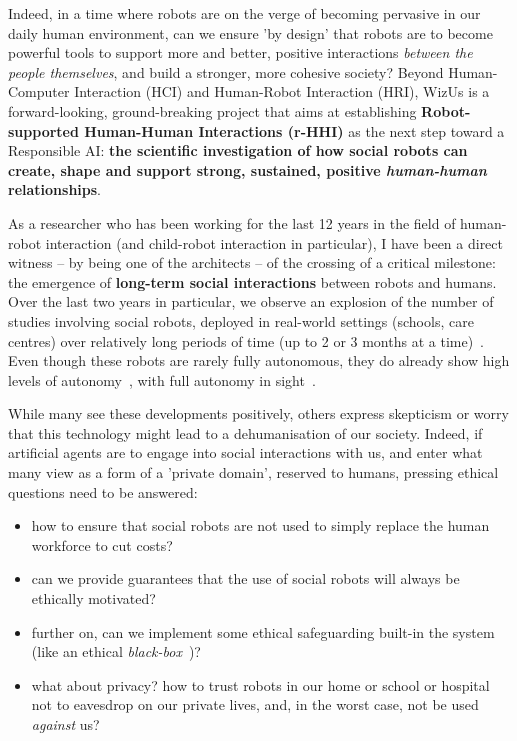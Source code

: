 \documentclass[11pt,a4paper]{report}
\newcommand{\project}{WizUs\xspace}
\begin{document}
Indeed, in a time where robots are on the verge of becoming pervasive in our
daily human environment, can we ensure 'by design' that robots are to become
powerful tools to support more and better, positive interactions \emph{between
the people themselves}, and build a stronger, more cohesive society? Beyond
Human-Computer Interaction (HCI) and Human-Robot Interaction (HRI), \project is
a forward-looking, ground-breaking project that aims at establishing
\textbf{Robot-supported Human-Human Interactions (r-HHI)} as the next step
toward a Responsible AI: \textbf{the scientific investigation of how social
robots can create, shape and support strong, sustained, positive
\emph{human-human} relationships}.

As a researcher who has been working for the last 12 years in the field of
human-robot interaction (and child-robot interaction in particular), I have been
a direct witness -- by being one of the architects -- of the crossing of a
critical milestone: the emergence of \textbf{long-term social interactions}
between robots and humans. Over the last two years in particular, we observe an
explosion of the number of studies involving social robots, deployed in
real-world settings (schools, care centres) over relatively long periods of time
(up to 2 or 3 months at a time)~\cite{kunze2018artificial,leite2013social}. Even
though these robots are rarely fully autonomous, they do already show high
levels of autonomy~\cite{senft2019teaching}, with full autonomy in
sight~\cite{hawes2017strands}.

While many see these developments positively,
others express skepticism or worry that this technology might lead to a
dehumanisation of our society. Indeed, if artificial agents are to engage into
social interactions with us, and enter what many view as a form of a 'private
domain', reserved to humans, pressing ethical questions need to be answered:

\begin{itemize}
    \item how to ensure that social robots are not used to simply replace the human
        workforce to cut costs?
    \item can we provide guarantees that the use of social robots will always be
        ethically motivated?
    \item further on, can we implement some ethical safeguarding built-in
        the system (like an ethical \emph{black-box}~\cite{winfield2017case})?
    \item what about privacy? how to trust robots in our home or school or
        hospital not to eavesdrop on our private lives, and, in the worst
        case, not be used \emph{against} us?
\end{itemize}
\end{document}
